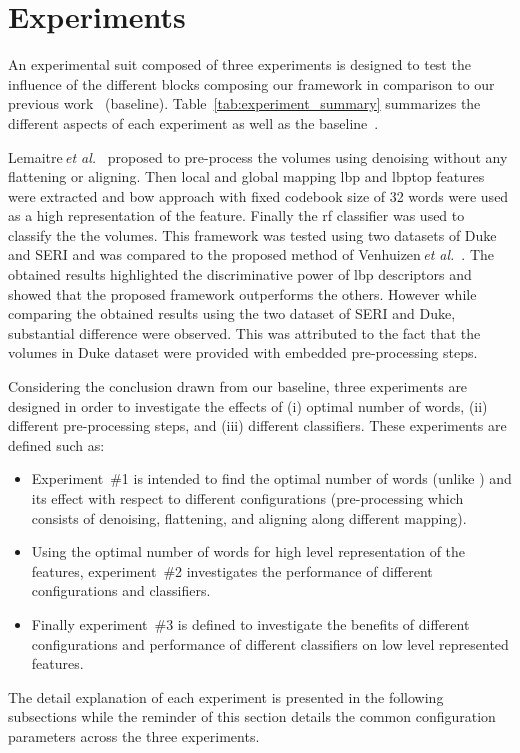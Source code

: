  \graphicspath{ {./content/experiment/figures/} }

\section{Experiments}
\label{sec:exp} 
An experimental suit composed of three experiments is designed to test the influence of the different blocks composing our framework in comparison to our previous work~\cite{Lemaintre2015miccaiOCT} (baseline).
Table~\ref{tab:experiment_summary} summarizes the different aspects of each experiment as well as the baseline~\cite{Lemaintre2015miccaiOCT}.
 
Lemaitre\,\textit{et al.}~\cite{Lemaintre2015miccaiOCT} proposed to pre-process the volumes using \nlm denoising without any flattening or aligning.
Then local and global mapping \ac{lbp} and \ac{lbptop} features were extracted and \ac{bow} approach with fixed codebook size of 32 words were used as a high representation of the feature.
Finally the \ac{rf} classifier was used to classify the the volumes. 
This framework was tested using two datasets of Duke and SERI and was compared to the proposed method of Venhuizen\,\textit{et al.}~\cite{Venhuizen2015}.
The obtained results highlighted the discriminative power of \ac{lbp} descriptors and showed that the proposed framework outperforms the others.
{\color{red}However while comparing the obtained results using the two dataset of SERI and Duke, substantial difference were observed.
This was attributed to the fact that the volumes in Duke dataset were provided with embedded pre-processing steps.}

Considering the conclusion drawn from our baseline, three experiments are designed in order to investigate the effects of (i) optimal number of words, (ii) different pre-processing steps, and (iii) different classifiers.
These experiments are defined such as: 

\begin{itemize}
\item Experiment~\#1 is intended to find the optimal number of words (unlike \cite{Lemaintre2015miccaiOCT}) and its effect with respect to different configurations (pre-processing which consists of denoising, flattening, and aligning along different mapping).
\item Using the optimal number of words for high level representation of the features, experiment~\#2 investigates the performance of different configurations and classifiers.
\item Finally experiment~\#3 is defined to investigate the benefits of different configurations and performance of different classifiers on low level represented features.
\end{itemize}
The detail explanation of each experiment is presented in the following subsections while the reminder of this section details the common configuration parameters across the three experiments. 

